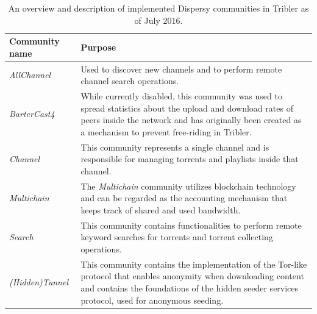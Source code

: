 \begin{table}
	\begin{tabularx}{\textwidth}{|l|X|}
		\hline
		\textbf{Community name} & \textbf{Purpose} \\ \hline
		\emph{AllChannel} & Used to discover new channels and to perform remote channel search operations.\\ \hline
		\emph{BarterCast4} & While currently disabled, this community was used to spread statistics about the upload and download rates of peers inside the network and has originally been created as a mechanism to prevent free-riding in Tribler\cite{meulpolder2009bartercast}.\\ \hline
		\emph{Channel} & This community represents a single channel and is responsible for managing torrents and playlists inside that channel.\\ \hline
		\emph{Multichain} & The \emph{Multichain} community utilizes blockchain technology and can be regarded as the accounting mechanism that keeps track of shared and used bandwidth.\\ \hline
		\emph{Search} & This community contains functionalities to perform remote keyword searches for torrents and torrent collecting operations.\\ \hline
		\emph{(Hidden)Tunnel} & This community contains the implementation of the Tor-like protocol that enables anonymity when downloading content and contains the foundations of the hidden seeder services protocol, used for anonymous seeding.\\ \hline
	\end{tabularx}
	\caption{An overview and description of implemented Dispersy communities in Tribler as of July 2016.}
	\label{table:dispersy-communities}
\end{table}

